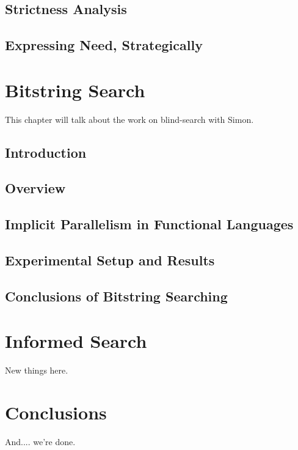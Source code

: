 \documentclass[justified]{tufte-book}
\begin{document}
    \section{Strictness Analysis}
    

    \section{Expressing Need, Strategically}
    
    
\chapter{Bitstring Search}

    This chapter will talk about the work on blind-search with Simon.

    \section{Introduction}
    

    \section{Overview}
    \label{sec:blind-Overview}
    

    \section{Implicit Parallelism in Functional Languages}
    \label{sec:blind-ParFunc}
    

    \section{Experimental Setup and Results}
    \label{sec:blind-Results}
    

    \section{Conclusions of Bitstring Searching}
    \label{sec:blind-Conclusion}
    

\chapter{Informed Search}

    New things here.
    \label{sec:informed-search}
    

\chapter{Conclusions}

    And.... we're done.

\backmatter



\end{document}
